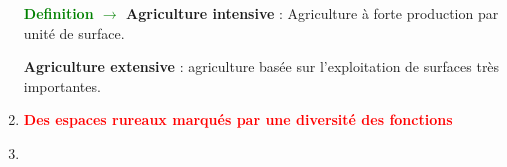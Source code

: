\documentclass[12pt,a4paper]{article}
\begin{document}
\begin{enumerate}[label=\Roman*]
\begin{table}[ht]
\begin{tabular}{|m{2.5cm}|p{2.5cm}|p{2.5cm}|p{2.5cm}|}
\end{tabular}
\end{table}


\textbf{\textcolor{green}{Definition $\rightarrow$ }
Agriculture intensive} : Agriculture à forte production par unité de surface.\par
\textbf{Agriculture extensive} : agriculture basée sur l’exploitation de surfaces très importantes.\par

\item	\textcolor{red}{\textbf{Des espaces rureaux marqués par une diversité des fonctions }}
\item	\textcolor{red}{\textbf{															}}



\end{enumerate}
\end{document}
